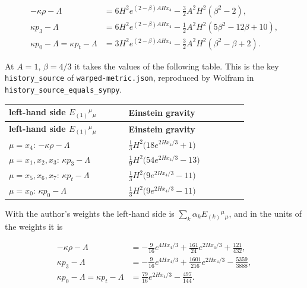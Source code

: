 \documentclass[11pt]{article}
\begin{document}
\[
\begin{aligned}
-\kappa\rho - \Lambda &= 6H^2e^{(2-\beta)AHx_4} - \tfrac32 A^2H^2(\beta^2 - 2), \\
\kappa p_3 - \Lambda &= 6H^2e^{(2-\beta)AHx_4} - \tfrac12 A^2H^2(5\beta^2 - 12\beta + 10), \\
\kappa p_0 - \Lambda = \kappa p_t - \Lambda &= 3H^2e^{(2-\beta)AHx_4} - \tfrac32 A^2H^2(\beta^2 - \beta + 2) .
\end{aligned}
\]

At $A = 1$, $\beta = 4/3$ it takes the values of the following table. This is the key \texttt{history\_\allowbreak{}source} of \texttt{warped-m\allowbreak{}etric.js\allowbreak{}on}, reproduced by Wolfram in \texttt{history\_\allowbreak{}source\_e\allowbreak{}quals\_sy\allowbreak{}mpy}.

\begingroup
\small
\begin{longtable}{@{}>{\raggedright\arraybackslash}p{0.400\linewidth}>{\raggedright\arraybackslash}p{0.400\linewidth}@{}}
\toprule
\textbf{left-hand side $E_{(1)}{}^\mu{}_\mu$} & \textbf{Einstein gravity} \\
\midrule
\endfirsthead
\toprule
\textbf{left-hand side $E_{(1)}{}^\mu{}_\mu$} & \textbf{Einstein gravity} \\
\midrule
\endhead
$\mu = x_4$: $-\kappa\rho - \Lambda$ & $\frac13 H^2\big(18e^{2Hx_4/3} + 1\big)$ \\
$\mu = x_1, x_2, x_3$: $\kappa p_3 - \Lambda$ & $\frac19 H^2\big(54e^{2Hx_4/3} - 13\big)$ \\
$\mu = x_5, x_6, x_7$: $\kappa p_t - \Lambda$ & $\frac13 H^2\big(9e^{2Hx_4/3} - 11\big)$ \\
$\mu = x_0$: $\kappa p_0 - \Lambda$ & $\frac13 H^2\big(9e^{2Hx_4/3} - 11\big)$ \\
\bottomrule
\end{longtable}
\endgroup

With the author's weights the left-hand side is $\sum_k\alpha_kE_{(k)}{}^\mu{}_\mu$, and in the units of the weights it is

\[
\begin{aligned}
-\kappa\rho - \Lambda &= -\tfrac{9}{16}e^{4Hx_4/3} + \tfrac{161}{24}e^{2Hx_4/3} + \tfrac{121}{432}, \\
\kappa p_3 - \Lambda &= -\tfrac{9}{16}e^{4Hx_4/3} + \tfrac{1601}{216}e^{2Hx_4/3} - \tfrac{5359}{3888}, \\
\kappa p_0 - \Lambda = \kappa p_t - \Lambda &= \tfrac{79}{16}e^{2Hx_4/3} - \tfrac{497}{144} .
\end{aligned}
\]
\end{document}
